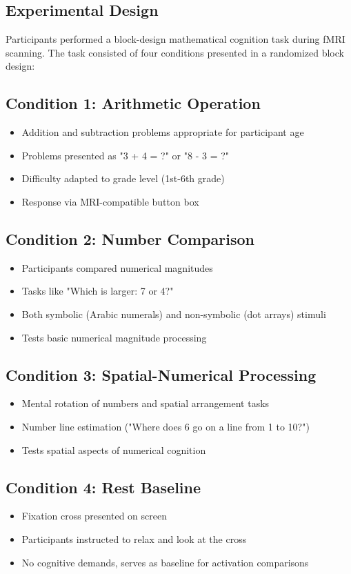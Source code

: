 \subsection{Experimental Design}
Participants performed a block-design mathematical cognition task during fMRI scanning. The task consisted of four conditions presented in a randomized block design:

\subsection*{Condition 1: Arithmetic Operation}
\begin{itemize}
\item Addition and subtraction problems appropriate for participant age
\item Problems presented as "3 + 4 = ?" or "8 - 3 = ?"
\item Difficulty adapted to grade level (1st-6th grade)
\item Response via MRI-compatible button box
\end{itemize}

\subsection*{Condition 2: Number Comparison}
\begin{itemize}
\item Participants compared numerical magnitudes
\item Tasks like "Which is larger: 7 or 4?"
\item Both symbolic (Arabic numerals) and non-symbolic (dot arrays) stimuli
\item Tests basic numerical magnitude processing
\end{itemize}


\subsection*{Condition 3: Spatial-Numerical Processing}
\begin{itemize}
\item Mental rotation of numbers and spatial arrangement tasks
\item Number line estimation ("Where does 6 go on a line from 1 to 10?")
\item Tests spatial aspects of numerical cognition
\end{itemize}

\subsection*{Condition 4: Rest Baseline}
\begin{itemize}
\item Fixation cross presented on screen
\item Participants instructed to relax and look at the cross
\item No cognitive demands, serves as baseline for activation comparisons
\end{itemize}


